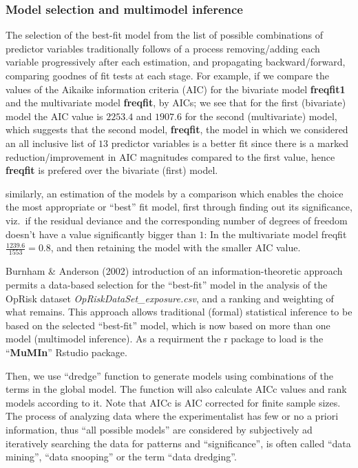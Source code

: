 \documentclass{DissertateUSU}
\begin{document}
\singlespacing

\doublespacing

\subsubsection{Model selection and multimodel inference}

The selection of the best-fit model from the list of possible
combinations of predictor variables traditionally follows of a process
removing/adding each variable progressively after each estimation, and
propagating backward/forward, comparing goodnes of fit tests at each
stage. For example, if we compare the values of the Aikaike information
criteria (AIC) for the bivariate model \textbf{freqfit1} and the
multivariate model \textbf{freqfit}, by AICs; we see that for the first
(bivariate) model the AIC value is \(2253.4\) and \(1907.6\) for the
second (multivariate) model, which suggests that the second model,
\textbf{freqfit}, the model in which we considered an all inclusive list
of \(13\) predictor variables is a better fit since there is a marked
reduction/improvement in AIC magnitudes compared to the first value,
hence \textbf{freqfit} is prefered over the bivariate (first) model.
\medskip

similarly, an estimation of the models by a comparison which enables the
choice the most appropriate or ``best'' fit model, first through finding
out its significance, viz.~if the residual deviance and the
corresponding number of degrees of freedom doesn't have a value
significantly bigger than \(1\): In the multivariate model freqfit
\(\frac{1239.6}{1553} = 0.8\), and then retaining the model with the
smaller AIC value.\medskip 

Burnham \& Anderson (2002) introduction of an information-theoretic
approach permits a data-based selection for the ``best-fit'' model in
the analysis of the OpRisk dataset \emph{OpRiskDataSet\_exposure.csv},
and a ranking and weighting of what remains. This approach allows
traditional (formal) statistical inference to be based on the selected
``best-fit'' model, which is now based on more than one model
(multimodel inference). As a requirment the r package to load is the
``\textbf{MuMIn}'' Rstudio package. \medskip

\singlespacing

\doublespacing

Then, we use ``dredge'' function to generate models using combinations
of the terms in the global model. The function will also calculate AICc
values and rank models according to it. Note that AICc is AIC corrected
for finite sample sizes. The process of analyzing data where the
experimentalist has few or no a priori information, thus ``all possible
models'' are considered by subjectively ad iteratively searching the
data for patterns and ``significance'', is often called ``data mining'',
``data snooping'' or the term ``data dredging''.
\end{document}
